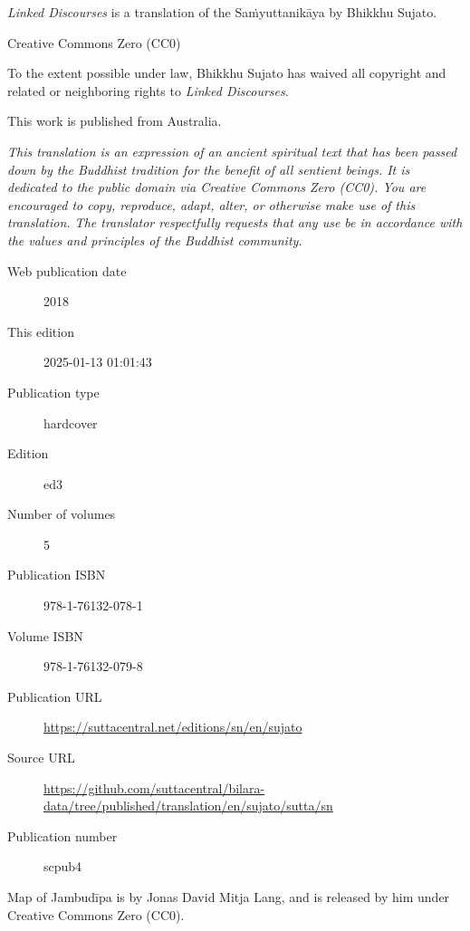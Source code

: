 \documentclass[12pt,openany]{book}%
\begin{document}
\begin{footnotesize}

\textit{Linked Discourses} is a translation of the Saṁyuttanikāya by Bhikkhu Sujato.

\medskip

Creative Commons Zero (CC0)

To the extent possible under law, Bhikkhu Sujato has waived all copyright and related or neighboring rights to \textit{Linked Discourses}.

\medskip

This work is published from Australia.

\begin{center}
\textit{This translation is an expression of an ancient spiritual text that has been passed down by the Buddhist tradition for the benefit of all sentient beings. It is dedicated to the public domain via Creative Commons Zero (CC0). You are encouraged to copy, reproduce, adapt, alter, or otherwise make use of this translation. The translator respectfully requests that any use be in accordance with the values and principles of the Buddhist community.}
\end{center}

\medskip

\begin{description}
    \item[Web publication date] 2018
    \item[This edition] 2025-01-13 01:01:43
    \item[Publication type] hardcover
    \item[Edition] ed3
    \item[Number of volumes] 5
    \item[Publication ISBN] 978-1-76132-078-1
    \item[Volume ISBN] 978-1-76132-079-8
    \item[Publication URL] \href{https://suttacentral.net/editions/sn/en/sujato}{https://suttacentral.net/editions/sn/en/sujato}
    \item[Source URL] \href{https://github.com/suttacentral/bilara-data/tree/published/translation/en/sujato/sutta/sn}{https://github.com/suttacentral/bilara-data/tree/published/translation/en/sujato/sutta/sn}
    \item[Publication number] scpub4
\end{description}

\medskip

Map of Jambudīpa is by Jonas David Mitja Lang, and is released by him under Creative Commons Zero (CC0).


\end{footnotesize}
\end{document}
